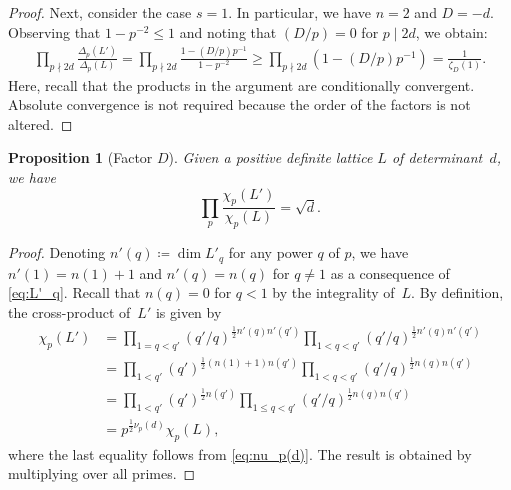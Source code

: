 \documentclass[a4paper]{amsart}
\theoremstyle{definition}
\theoremstyle{plain}
\newtheorem{proposition}[definition]{Proposition}
\begin{document}
\begin{proof}
Next, consider the case \( s = 1 \). In particular, we have \(n = 2\) and \(D = -d\). Observing that \( 1 - p^{-2} \leq 1 \) and noting that \( (D/p) = 0 \) for \( p \mid 2d \), we obtain:
\begin{align*}
    \prod_{p \nmid 2d} \frac{\Delta_p(L')}{\Delta_p(L)} 
    = \prod_{p \nmid 2d} \frac{1 - (D/p)p^{-1}}{1 - p^{-2}} 
    \geq \prod_{p \nmid 2d} (1 - (D/p)p^{-1}) 
    = \frac{1}{\zeta_D(1)}.
\end{align*}
Here, recall that the products in the argument are conditionally convergent. Absolute convergence is not required because the order of the factors is not altered.

\end{proof}

\begin{proposition}[Factor \(D\)] \label{prop:factor.D}
    Given a positive definite lattice \(L\) of determinant~\(d\), we have
    \begin{equation*} 
        \prod_p \frac{\chi_p(L')}{\chi_p(L)} = \sqrt{d}.
    \end{equation*}
\end{proposition}
\begin{proof}
    Denoting \(n'(q) \coloneqq \dim L'_q\) for any power \(q\) of \(p\), we have \(n'(1) = n(1) + 1\) and \(n'(q) = n(q)\) for \(q \neq 1\) as a consequence of \eqref{eq:L'_q}. Recall that \(n(q) = 0\) for \(q<1\) by the integrality of~\(L\). By definition, the cross-product of~\(L'\) is given by
    \begin{align*}
        \chi_p(L') & = \prod_{1 = q < q'} (q'/q)^{\frac{1}{2} n'(q) n'(q')} \prod_{1 < q < q'} (q'/q)^{\frac{1}{2} n'(q) n'(q')} \\
                & = \prod_{1 < q'} (q')^{\frac 12 (n(1)+1)n(q')} \prod_{1 < q < q'} (q'/q)^{\frac{1}{2} n(q) n(q')} \\
                & = \prod_{1 < q'} (q')^{\frac 12 n(q')} \prod_{1 \leq q < q'} (q'/q)^{\frac{1}{2} n(q) n(q')} \\
                & = p^{\frac{1}{2}\nu_p(d)} \chi_p(L),
    \end{align*}
    where the last equality follows from \eqref{eq:nu_p(d)}. The result is obtained by multiplying over all primes.
\end{proof}
\end{document}
